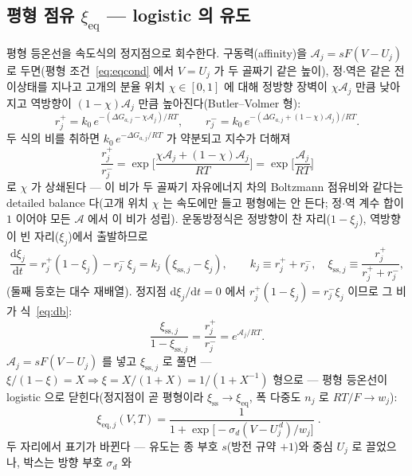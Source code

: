 \documentclass[11pt,a4paper]{article}
\newcommand{\dd}{\mathrm{d}}
\newcommand{\eq}{\mathrm{eq}}
\newcommand{\sstat}{\mathrm{ss}}
\begin{document}
\subsection{평형 점유 $\xi_\eq$ — logistic 의 유도}
평형 등온선을 속도식의 정지점으로 회수한다. 구동력(affinity)을 $\mathcal A_j=sF(V-U_j)$ 로 두면(평형 조건~\eqref{eq:eqcond}
에서 $V=U_j$ 가 두 골짜기 같은 높이), 정$\cdot$역은 같은 전이상태를 지나고 고개의 분율 위치 $\chi\in[0,1]$ 에 대해
정방향 장벽이 $\chi\mathcal A_j$ 만큼 낮아지고 역방향이 $(1-\chi)\mathcal A_j$ 만큼 높아진다(Butler--Volmer 형):
\begin{equation}
r_j^+=k_0\,e^{-(\Delta G_{a,j}-\chi\mathcal A_j)/RT},\qquad
r_j^-=k_0\,e^{-(\Delta G_{a,j}+(1-\chi)\mathcal A_j)/RT}.
\label{eq:bv}
\end{equation}
두 식의 비를 취하면 $k_0\,e^{-\Delta G_{a,j}/RT}$ 가 약분되고 지수가 더해져
\begin{equation}
\frac{r_j^+}{r_j^-}
=\exp\!\Big[\frac{\chi\mathcal A_j+(1-\chi)\mathcal A_j}{RT}\Big]
=\exp\!\Big[\frac{\mathcal A_j}{RT}\Big]
\label{eq:db}
\end{equation}
로 $\chi$ 가 상쇄된다 --- 이 비가 두 골짜기 자유에너지 차의 Boltzmann 점유비와 같다는 detailed balance 다(고개 위치
$\chi$ 는 속도에만 들고 평형에는 안 든다; 정$\cdot$역 계수 합이 $1$ 이어야 모든 $\mathcal A$ 에서 이 비가 성립). 운동방정식은
정방향이 찬 자리($1-\xi_j$), 역방향이 빈 자리($\xi_j$)에서 출발하므로
\begin{equation}
\frac{\dd\xi_j}{\dd t}=r_j^+(1-\xi_j)-r_j^-\,\xi_j
=k_j\,(\xi_{\sstat,j}-\xi_j),\qquad
k_j\equiv r_j^++r_j^-,\quad\xi_{\sstat,j}\equiv\frac{r_j^+}{r_j^++r_j^-},
\label{eq:relax}
\end{equation}
(둘째 등호는 대수 재배열). 정지점 $\dd\xi_j/\dd t=0$ 에서 $r_j^+(1-\xi_j)=r_j^-\xi_j$ 이므로 그 비가 식~\eqref{eq:db}:
\begin{equation}
\frac{\xi_{\sstat,j}}{1-\xi_{\sstat,j}}=\frac{r_j^+}{r_j^-}=e^{\mathcal A_j/RT}.
\label{eq:stationary}
\end{equation}
$\mathcal A_j=sF(V-U_j)$ 를 넣고 $\xi_{\sstat,j}$ 로 풀면 --- $\xi/(1-\xi)=X\Rightarrow\xi=X/(1+X)=1/(1+X^{-1})$
형으로 --- 평형 등온선이 logistic 으로 닫힌다(정지점이 곧 평형이라 $\xi_\sstat\to\xi_\eq$, 폭 다중도 $n_j$ 로
$RT/F\to w_j$):
\begin{equation}
\boxed{\;\xi_{\eq,j}(V,T)=\frac{1}{1+\exp\!\big[-\sigma_d(V-U_j^{\,d})/w_j\big]}\;.}
\label{eq:xieq}
\end{equation}
두 자리에서 표기가 바뀐다 --- 유도는 종 부호 $s$(방전 규약 $+1$)와 중심 $U_j$ 로 끌었으나, 박스는 방향 부호 $\sigma_d$ 와
\end{document}
